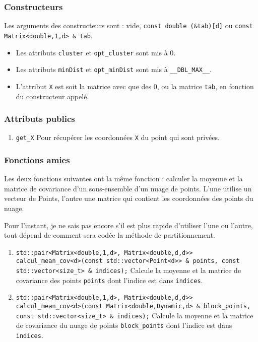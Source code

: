 \documentclass[10pt,a4paper,notitlepage]{article}
\begin{document}
\subsubsection{Constructeurs}
Les arguments des constructeurs sont : vide, \texttt{const double (\&tab)[d]} ou \texttt{const Matrix<double,1,d> \& tab}.
\begin{itemize}
\item Les attributs \texttt{cluster} et \texttt{opt\_cluster} sont mis à 0.
\item Les attributs \texttt{minDist} et \texttt{opt\_minDist} sont mis à \texttt{\_\_DBL\_MAX\_\_}.
\item L'attribut \texttt{X} est soit la matrice avec que des 0, ou la matrice \texttt{tab}, en fonction du constructeur appelé.
\end{itemize}
\subsubsection{Attributs publics}
\begin{enumerate}
\item \texttt{get\_X} Pour récupérer les coordonnées \texttt{X} du point qui sont privées.
\end{enumerate}
\subsubsection{Fonctions amies}
Les deux fonctions suivantes ont la même fonction : calculer la moyenne et la matrice de covariance d'un sous-ensemble d'un nuage de points. L'une utilise un vecteur de Points, l'autre une matrice qui contient les coordonnées des points du nuage.

{\color{red} Pour l'instant, je ne sais pas encore s'il est plus rapide d'utiliser l'une ou l'autre, tout dépend de comment sera codée la méthode de partitionnement.}

\begin{enumerate}
\item \texttt{std::pair<Matrix<double,1,d>, Matrix<double,d,d>> calcul\_mean\_cov<d>(const std::vector<Point<d>> \& points, const std::vector<size\_t> \& indices);} Calcule la moyenne et la matrice de covariance des points \texttt{points} dont l'indice est dans \texttt{indices}.
\item \texttt{std::pair<Matrix<double,1,d>, Matrix<double,d,d>> calcul\_mean\_cov<d>(const Matrix<double,Dynamic,d> \& block\_points, const std::vector<size\_t> \& indices);}  Calcule la moyenne et la matrice de covariance du nuage de points \texttt{block\_points} dont l'indice est dans \texttt{indices}.
\end{enumerate}
\end{document}
